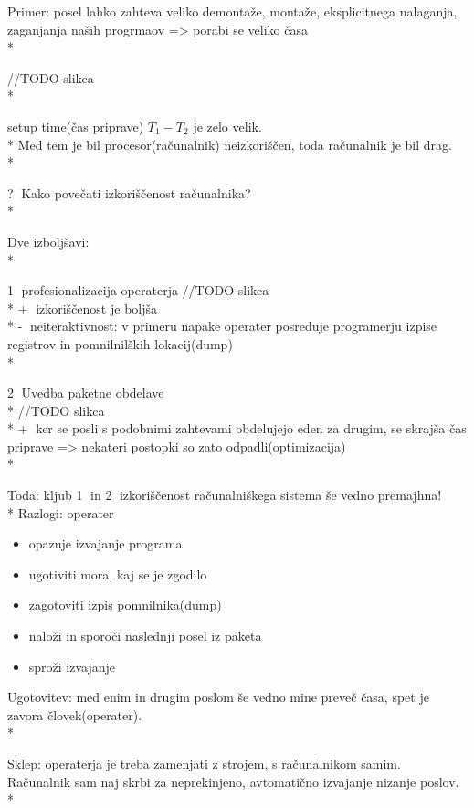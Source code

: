 \documentclass{article}
\begin{document}
Primer: posel lahko zahteva veliko demontaže, montaže, eksplicitnega nalaganja, zaganjanja naših progrmaov => porabi se veliko časa\\*

//TODO slikca\\*

setup time(čas priprave)
\begin{math}
  T_1 - T_2
\end{math}
je zelo velik.\\*
Med tem je bil procesor(računalnik) neizkoriščen, toda računalnik je bil drag.\\*

\textcircled{?} Kako povečati izkoriščenost računalnika?\\*

Dve izboljšavi:\\*

\textcircled{1} profesionalizacija operaterja
//TODO slikca\\*
\textcircled{+} izkoriščenost je boljša\\*
\textcircled{-} neiteraktivnost: v primeru napake operater posreduje programerju izpise registrov in pomnilnilških lokacij(dump)\\*

\textcircled{2} Uvedba paketne obdelave\\*
//TODO slikca\\*
\textcircled{+} ker se posli s podobnimi zahtevami obdelujejo eden za drugim, se skrajša čas priprave => nekateri postopki so zato odpadli(optimizacija)\\*

Toda: kljub \textcircled{1} in \textcircled{2} izkoriščenost računalniškega sistema še vedno premajhna!\\*
Razlogi: operater
\begin{itemize}
  \item opazuje izvajanje programa
  \item ugotiviti mora, kaj se je zgodilo
  \item zagotoviti izpis pomnilnika(dump)
  \item naloži in sporoči naslednji posel iz paketa
  \item sproži izvajanje
\end{itemize}

Ugotovitev: med enim in drugim poslom še vedno mine preveč časa, spet je zavora človek(operater).\\*

Sklep: operaterja je treba zamenjati z strojem, s računalnikom samim. Računalnik sam naj skrbi  za neprekinjeno, avtomatično izvajanje nizanje poslov.\\*
\end{document}
